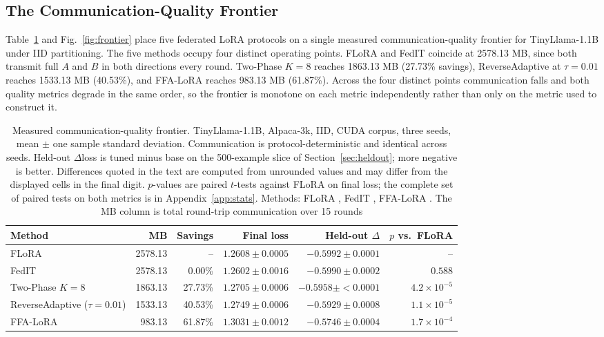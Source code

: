 \documentclass[iicol,pdflatex,sn-mathphys-num]{sn-jnl}
\begin{document}
\subsection{The Communication-Quality Frontier}
\label{sec:frontier}
Table~\ref{tab:frontier} and Fig.~\ref{fig:frontier} place five federated LoRA protocols on a single measured communication-quality frontier for TinyLlama-1.1B \cite{zhang2024tinyllama} under IID partitioning. The five methods occupy four distinct operating points. FLoRA \cite{wang2024flora} and FedIT \cite{zhang2024federatedgpt} coincide at 2578.13 MB, since both transmit full $A$ and $B$ in both directions every round. Two-Phase $K{=}8$ reaches 1863.13 MB (27.73\% savings), ReverseAdaptive at $\tau{=}0.01$ reaches 1533.13 MB (40.53\%), and FFA-LoRA \cite{sun2024ffalora} reaches 983.13 MB (61.87\%). Across the four distinct points communication falls and both quality metrics degrade in the same order, so the frontier is monotone on each metric independently rather than only on the metric used to construct it.

\begin{table}[tbp]
\centering
\footnotesize
\setlength{\tabcolsep}{6pt}
\caption{Measured communication-quality frontier. TinyLlama-1.1B, Alpaca-3k, IID, CUDA corpus, three seeds, mean $\pm$ one sample standard deviation. Communication is protocol-deterministic and identical across seeds. Held-out $\Delta$loss is tuned minus base on the 500-example slice of Section~\ref{sec:heldout}; more negative is better. Differences quoted in the text are computed from unrounded values and may differ from the displayed cells in the final digit. $p$-values are paired $t$-tests against FLoRA on final loss; the complete set of paired tests on both metrics is in Appendix~\ref{app:stats}. Methods: FLoRA \cite{wang2024flora}, FedIT \cite{zhang2024federatedgpt}, FFA-LoRA \cite{sun2024ffalora}. The MB column is total round-trip communication over 15 rounds}
\label{tab:frontier}
\begin{tabular}{@{}lrrrrr@{}}
\toprule
Method & MB & Savings & Final loss & Held-out $\Delta$ & $p$ vs.\ FLoRA \\
\midrule
FLoRA                                 & 2578.13 & --      & $1.2608 \pm 0.0005$ & $-0.5992 \pm 0.0001$ & -- \\
FedIT                                 & 2578.13 & 0.00\%  & $1.2602 \pm 0.0016$ & $-0.5990 \pm 0.0002$ & $0.588$ \\
Two-Phase $K{=}8$                   & 1863.13 & 27.73\% & $1.2705 \pm 0.0006$ & $-0.5958 \pm {<}0.0001$ & $4.2 \times 10^{-5}$ \\
ReverseAdaptive ($\tau{=}0.01$)     & 1533.13 & 40.53\% & $1.2749 \pm 0.0006$ & $-0.5929 \pm 0.0008$ & $1.1 \times 10^{-5}$ \\
FFA-LoRA                             & 983.13 & 61.87\% & $1.3031 \pm 0.0012$ & $-0.5746 \pm 0.0004$ & $1.7 \times 10^{-4}$ \\
\bottomrule
\end{tabular}
\end{table}
\end{document}

